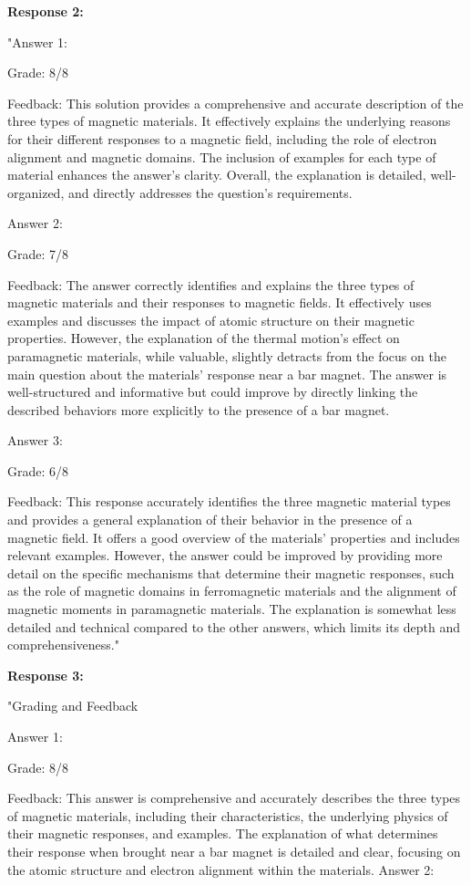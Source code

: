 \documentclass[a4paper,11pt]{article}
\begin{document}
\textbf{Response 2:}

"Answer 1:

Grade: 8/8

Feedback: This solution provides a comprehensive and accurate description of the three types of magnetic materials. It effectively explains the underlying reasons for their different responses to a magnetic field, including the role of electron alignment and magnetic domains. The inclusion of examples for each type of material enhances the answer's clarity. Overall, the explanation is detailed, well-organized, and directly addresses the question's requirements.

Answer 2:

Grade: 7/8

Feedback: The answer correctly identifies and explains the three types of magnetic materials and their responses to magnetic fields. It effectively uses examples and discusses the impact of atomic structure on their magnetic properties. However, the explanation of the thermal motion's effect on paramagnetic materials, while valuable, slightly detracts from the focus on the main question about the materials' response near a bar magnet. The answer is well-structured and informative but could improve by directly linking the described behaviors more explicitly to the presence of a bar magnet.

Answer 3:

Grade: 6/8

Feedback: This response accurately identifies the three magnetic material types and provides a general explanation of their behavior in the presence of a magnetic field. It offers a good overview of the materials' properties and includes relevant examples. However, the answer could be improved by providing more detail on the specific mechanisms that determine their magnetic responses, such as the role of magnetic domains in ferromagnetic materials and the alignment of magnetic moments in paramagnetic materials. The explanation is somewhat less detailed and technical compared to the other answers, which limits its depth and comprehensiveness."

\textbf{Response 3:}

"Grading and Feedback

Answer 1:

Grade: 8/8

Feedback: This answer is comprehensive and accurately describes the three types of magnetic materials, including their characteristics, the underlying physics of their magnetic responses, and examples. The explanation of what determines their response when brought near a bar magnet is detailed and clear, focusing on the atomic structure and electron alignment within the materials.
Answer 2:
\end{document}
